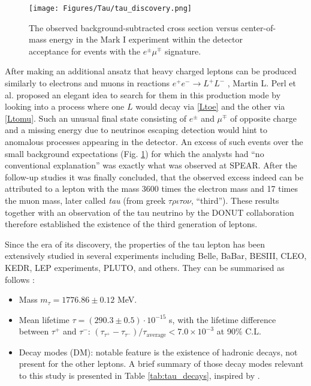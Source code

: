 \begin{figure}[ht!]
    \centering
    \texttt{[image: Figures/Tau/tau\_discovery.png]}
    \caption{The observed background-subtracted cross section versus center-of-mass energy in the Mark I experiment within the detector acceptance for events with the $e^\pm\mu^\mp$ signature. \cite{Perl:1975bf}}
    \label{fig:tau-discovery}
\end{figure}

After making an additional ansatz that heavy charged leptons can be produced similarly to electrons and muons in reactions $e^+e^- \to L^+L^-$ ,  Martin L. Perl et al. proposed an elegant idea to search for them in this production mode by looking into a process where one $L$ would decay via \ref{Ltoe} and the other via \ref{Ltomu}. Such an unusual final state consisting of $e^\pm$ and $\mu^\mp$ of opposite charge and a missing energy due to neutrinos escaping detection would hint to anomalous processes appearing in the detector. An excess of such events over the small background expectations (Fig. \ref{fig:tau-discovery}) for which the analysts had \enquote{no conventional explanation} was exactly what was observed at SPEAR. After the follow-up studies \cite{Feldman:1976fm, PLUTO:1977ctk, Barbaro-Galtieri:1977kfn, Bartel:1978ii, Bacino:1978gb, Bacino:1978wj} it was finally concluded, that the observed excess indeed can be attributed to a lepton with the mass 3600 times the electron mass and 17 times the muon mass, later called \textit{tau} (from greek $\tau\rho\iota\tau o\nu$, \enquote{third}). These results together with an observation of the tau neutrino by the DONUT collaboration \cite{DONUT:2000fbd} therefore established the existence of the third generation of leptons.

Since the era of its discovery, the properties of the tau lepton has been extensively studied in several experiments including Belle, BaBar, BESIII, CLEO, KEDR, LEP experiments, PLUTO, and others. They can be summarised as follows \cite{ParticleDataGroup:2020ssz}:
\begin{itemize}
    \item Mass $m_\tau = 1776.86 \pm 0.12$ MeV.
    \item Mean lifetime $\tau = (290.3 \pm 0.5) \cdot 10^{-15}$ s, with the lifetime difference between $\tau^+$ and $\tau^-$: $(\tau_{\tau^+} - \tau_{\tau^-})/\tau_\text{average} < 7.0 \times 10^{-3}$ at 90\% C.L.  
    \item Decay modes (DM): notable feature is the existence of hadronic decays, not present for the other leptons. A brief summary of those decay modes relevant to this study is presented in Table \ref{tab:tau_decays}, inspired by \cite{CMS:2022prd}.
\end{itemize}

